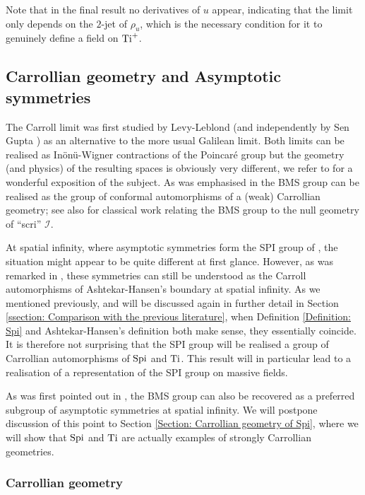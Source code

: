 \documentclass[a4paper, 10pt]{article}
\theoremstyle{remark}
\newcommand{\Ti}{\textnormal{Ti}}
\newcommand{\Spi}{\textnormal{Spi}}
\begin{document}
Note that in the final result no derivatives of $u$ appear, indicating that the limit only depends on the $2$-jet of $\rho_u$,  which is the necessary condition for it to genuinely define a field on $\Ti^+$.


\subsection{Carrollian geometry and Asymptotic symmetries}

The Carroll limit was first studied by Levy-Leblond \cite{levy-leblond_nouvelle_1965} (and independently by Sen Gupta \cite{SenGupta:1966qer}) as an alternative to the more usual Galilean limit. Both limits can be realised as Inönü-Wigner contractions of the Poincaré group but the geometry (and physics) of the resulting spaces is obviously very different, we refer to \cite{duval_carroll_2014} for a wonderful exposition of the subject. As was emphasised in \cite{duval_conformal_2014} the BMS group can be realised as the group of conformal automorphisms of a (weak) Carrollian geometry; see also \cite{geroch_asymptotic_1977,ashtekar_geometry_2015} for classical work relating the BMS group to the null geometry of \enquote{scri} $\mathscr{I}$.

At spatial infinity, where asymptotic symmetries form the SPI group of \cite{ashtekar_unified_1978,Ashtekar:1991vb}, the situation might appear to be quite different at first glance. However, as was remarked in \cite{gibbons_ashtekar-hansen_2019}, these symmetries can still be understood as the Carroll automorphisms of Ashtekar-Hansen's boundary at spatial infinity. As we mentioned previously, and will be discussed again in further detail in Section \ref{ssection: Comparison with the previous literature}, when Definition \ref{Definition: Spi} and Ashtekar-Hansen's definition both make sense, they essentially coincide. It is therefore not surprising that the SPI group will be realised a group of Carrollian automorphisms of $\Spi$ and $\Ti$. This result will in particular lead to a realisation of a representation of the SPI group on massive fields. 

As was first pointed out in \cite{troessaert_bms4_2018}, the BMS group can also be recovered as a preferred subgroup of asymptotic symmetries at spatial infinity. We will postpone discussion of this point to Section \ref{Section: Carrollian geometry of Spi}, where we will show that $\Spi$ and $\Ti$ are actually examples of strongly Carrollian geometries.

\subsubsection{Carrollian geometry}\label{sssection: Carrollian geometry}
\end{document}
